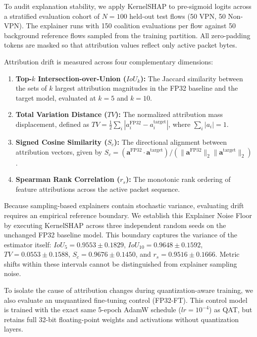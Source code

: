 \documentclass[conference]{IEEEtran}
\begin{document}
To audit explanation stability, we apply KernelSHAP to pre-sigmoid logits across a stratified evaluation cohort of $N = 100$ held-out test flows (50 VPN, 50 Non-VPN). The explainer runs with 150 coalition evaluations per flow against 50 background reference flows sampled from the training partition. All zero-padding tokens are masked so that attribution values reflect only active packet bytes. 

Attribution drift is measured across four complementary dimensions:
\begin{enumerate}
    \item \textbf{Top-$k$ Intersection-over-Union ($IoU_k$):} The Jaccard similarity between the sets of $k$ largest attribution magnitudes in the FP32 baseline and the target model, evaluated at $k = 5$ and $k = 10$.
    \item \textbf{Total Variation Distance ($TV$):} The normalized attribution mass displacement, defined as $TV = \frac{1}{2} \sum_{i} |a_i^{\text{FP32}} - a_i^{\text{target}}|$, where $\sum_i |a_i| = 1$.
    \item \textbf{Signed Cosine Similarity ($S_c$):} The directional alignment between attribution vectors, given by $S_c = (\mathbf{a}^{\text{FP32}} \cdot \mathbf{a}^{\text{target}}) / (\|\mathbf{a}^{\text{FP32}}\|_2 \|\mathbf{a}^{\text{target}}\|_2)$.
    \item \textbf{Spearman Rank Correlation ($r_s$):} The monotonic rank ordering of feature attributions across the active packet sequence.
\end{enumerate}

Because sampling-based explainers contain stochastic variance, evaluating drift requires an empirical reference boundary. We establish this Explainer Noise Floor by executing KernelSHAP across three independent random seeds on the unchanged FP32 baseline model. This boundary captures the variance of the estimator itself: $IoU_5 = 0.9553 \pm 0.1829$, $IoU_{10} = 0.9648 \pm 0.1592$, $TV = 0.0553 \pm 0.1588$, $S_c = 0.9676 \pm 0.1450$, and $r_s = 0.9516 \pm 0.1666$. Metric shifts within these intervals cannot be distinguished from explainer sampling noise.

To isolate the cause of attribution changes during quantization-aware training, we also evaluate an unquantized fine-tuning control (FP32-FT). This control model is trained with the exact same 5-epoch AdamW schedule ($lr = 10^{-4}$) as QAT, but retains full 32-bit floating-point weights and activations without quantization layers.
\end{document}
